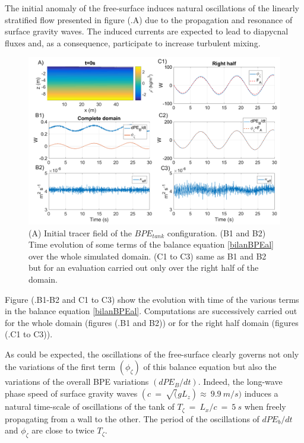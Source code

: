 The initial anomaly of the free-surface induces natural oscillations of the linearly stratified flow presented in figure (.A) due to the propagation and resonance of surface gravity waves. The induced currents are expected to lead to diapycnal fluxes and, as a consequence, participate to increase turbulent mixing.

\begin{figure}[h!]
\centering
\includegraphics[width=1\textwidth]{./CHAP_BPE/Fig_TANK_linS.png}
\caption[Initial tracer field and evaluation of $\kappa_{eff}$ for configuration $BPE_{tank}$]{(A) Initial tracer field of the $BPE_{tank}$ configuration. (B1 and B2) Time evolution of some terms of the balance equation \ref{bilanBPEal} over the whole simulated domain. (C1 to C3) same as B1 and B2 but for an evaluation carried out only over the right half of the domain.}
\label{figClin}
\end{figure}
Figure (.B1-B2 and C1 to C3) show %
the evolution with time of the various terms in the balance equation \ref{bilanBPEal}. Computations are successively carried out for the whole domain (figures (.B1 and B2)) or for the right half domain (figures (.C1 to C3)).

As could be expected, the oscillations of the free-surface clearly governs not only the variations of the first term $(\phi_{\zeta})$ of this balance equation but also the variations of the overall BPE variations $(dPE_B/dt)$. Indeed, the long-wave phase speed of surface gravity waves $(c\ =\ \sqrt(g L_z)\approx\ 9.9\ m/s)$ induces a natural time-scale of oscillations of the tank of $T_{\zeta}\ =\ L_x/c\ =\ 5\ s$ when freely propagating from a wall to the other. The period of the oscillations of $dPE_b/dt$ and $\phi_{\zeta}$ are close to twice $T_{\zeta}$.

